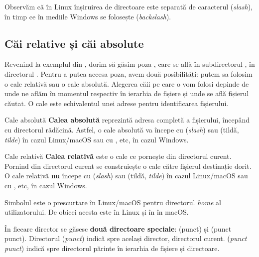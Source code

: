 Observăm că în Linux înșiruirea de directoare este separată de caracterul \file{/} (\textit{slash}), în timp ce în mediile Windows se folosește \file{\textbackslash{}} (\textit{backslash}).

\subsection{Căi relative și căi absolute}
\label{sec:fs:path}

Revenind la exemplul din , dorim să găsim poza , care se află în subdirectorul , în directorul .
Pentru a putea accesa poza, avem două posibilități: putem sa folosim o cale relativă sau o cale absolută.
Alegerea căii pe care o vom folosi depinde de unde ne aflăm în momentul respectiv în ierarhia de fișiere și unde se află fișierul căutat.
O cale este echivalentul unei adrese pentru identificarea fișierului.

\begin{definition}{Cale absolută}
\textbf{Calea absolută} reprezintă adresa completă a fișierului, începând cu directorul rădăcină.
Astfel, o cale absolută va începe cu \file{/} (\textit{slash}) sau \file{\textasciitilde{}} (tildă, \textit{tilde}) în cazul Linux/macOS sau cu ,  etc, în cazul Windows.
\end{definition}

\begin{definition}{Cale relativă}
\textbf{Calea relativă} este o cale ce pornește din directorul curent.
Pornind din directorul curent se construiește o cale către fișierul destinație dorit.
O cale relativă \textbf{nu} începe cu \file{/} (\textit{slash}) sau \file{\textasciitilde{}} (tildă, \textit{tilde}) în cazul Linux/macOS sau cu ,  etc, în cazul Windows.
\end{definition}

\begin{note}
Simbolul \file{\textasciitilde{}} este o prescurtare în Linux/macOS pentru directorul \textit{home} al utilizatorului.
De obicei acesta este  în Linux și în  în macOS.
\end{note}

În fiecare director se găsesc \textbf{două directoare speciale}:  (punct) și  (punct punct).
Directorul  (\textit{punct}) indică spre același director, directorul curent.
 (\textit{punct punct}) indică spre directorul părinte în ierarhia de fișiere și directoare.

